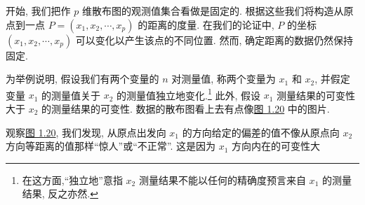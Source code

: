 开始, 我们把作 $p$ 维散布图的观测值集合看做是固定的. 根据这些我们将构造从原点到一点 $P = (x_1, x_2, \cdots, x_p)$ 的距离的度量. 在我们的论证中, $P$ 的坐标 $(x_1, x_2, \cdots, x_p)$ 可以变化以产生该点的不同位置. 然而, 确定距离的数据仍然保持固定.

\begin{mvfigure}
\label{fig:1.20}
\end{mvfigure}

为举例说明, 假设我们有两个变量的 $n$ 对测量值, 称两个变量为 $x_1$ 和 $x_2$, 并假定变量 $x_1$ 的测量值关于 $x_2$ 的测量值独立地变化.\footnote{在这方面,“独立地”意指 $x_2$ 测量结果不能以任何的精确度预言来自 $x_1$ 的测量结果, 反之亦然.} 此外, 假设 $x_1$ 测量结果的可变性大于 $x_2$ 的测量结果的可变性. 数据的散布图看上去有点像\hyperref[fig:1.20]{图 1.20} 中的图片.

观察\hyperref[fig:1.20]{图 1.20}, 我们发现, 从原点出发向 $x_1$ 的方向给定的偏差的值不像从原点向 $x_2$ 方向等距离的值那样“惊人”或“不正常”. 这是因为 $x_1$ 方向内在的可变性大
